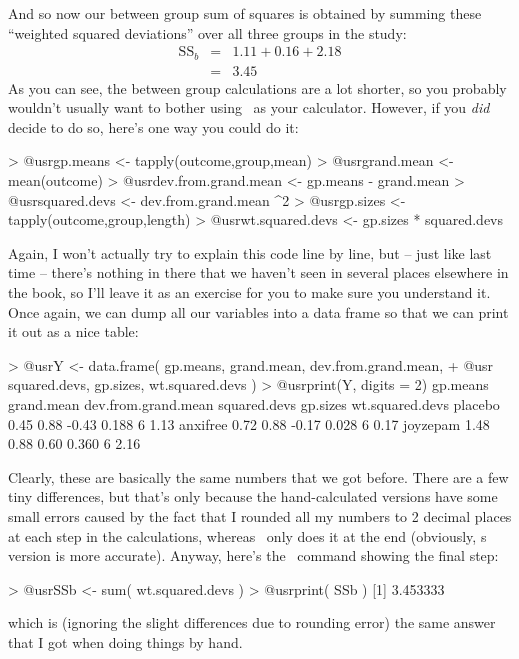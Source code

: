 \noindent
And so now our between group sum of squares is obtained by summing these ``weighted squared deviations'' over all three groups in the study:
$$
\begin{array}{rcl}
\mbox{SS}_{b} &=& 1.11 + 0.16 + 2.18 \\
&=& 3.45
\end{array}
$$
As you can see, the between group calculations are a lot shorter, so you probably wouldn't usually want to bother using \R\ as your calculator. However, if you {\it did} decide to do so, here's one way you could do it:
\begin{rblock1}
> @usr{gp.means <- tapply(outcome,group,mean)}
> @usr{grand.mean <- mean(outcome)}
> @usr{dev.from.grand.mean <- gp.means - grand.mean}
> @usr{squared.devs <- dev.from.grand.mean ^2}
> @usr{gp.sizes <- tapply(outcome,group,length)}
> @usr{wt.squared.devs <- gp.sizes * squared.devs}
\end{rblock1}
Again, I won't actually try to explain this code line by line, but -- just like last time -- there's nothing in there that we haven't seen in several places elsewhere in the book, so I'll leave it as an exercise for you to make sure you understand it. Once again, we can dump all our variables into a data frame so that we can print it out as a nice table:
\begin{rblock1}
> @usr{Y <- data.frame( gp.means, grand.mean, dev.from.grand.mean,} 
+ @usr{                 squared.devs, gp.sizes, wt.squared.devs )}
> @usr{print(Y, digits = 2)}
         gp.means grand.mean dev.from.grand.mean squared.devs gp.sizes wt.squared.devs
placebo      0.45       0.88               -0.43        0.188        6            1.13
anxifree     0.72       0.88               -0.17        0.028        6            0.17
joyzepam     1.48       0.88                0.60        0.360        6            2.16
\end{rblock1}
Clearly, these are basically the same numbers that we got before. There are a few tiny differences, but that's only because the hand-calculated versions have some small errors caused by the fact that I rounded all my numbers to 2 decimal places at each step in the calculations, whereas \R\ only does it at the end (obviously, \R s version is more accurate). Anyway, here's the \R\ command showing the final step:
\begin{rblock1}
> @usr{SSb <- sum( wt.squared.devs )}
> @usr{print( SSb )}
[1] 3.453333
\end{rblock1}
which is (ignoring the slight differences due to rounding error) the same answer that I got when doing things by hand.

